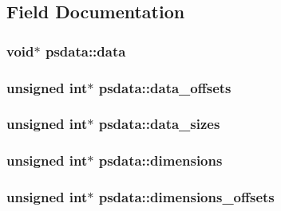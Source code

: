 \subsection{Field Documentation}
\hypertarget{structpsdata_aec5fdd50200a11795db62f21f2fedbe7}{}
\subsubsection[{data}]{\setlength{\rightskip}{0pt plus 5cm}void$\ast$ psdata\+::data}\label{structpsdata_aec5fdd50200a11795db62f21f2fedbe7}
\hypertarget{structpsdata_a372c86d30fafae1b30546d20f02cf982}{}
\subsubsection[{data\+\_\+offsets}]{\setlength{\rightskip}{0pt plus 5cm}unsigned int$\ast$ psdata\+::data\+\_\+offsets}\label{structpsdata_a372c86d30fafae1b30546d20f02cf982}
\hypertarget{structpsdata_a80714eccad0f11f36babbbaf7360364b}{}
\subsubsection[{data\+\_\+sizes}]{\setlength{\rightskip}{0pt plus 5cm}unsigned int$\ast$ psdata\+::data\+\_\+sizes}\label{structpsdata_a80714eccad0f11f36babbbaf7360364b}
\hypertarget{structpsdata_a9e5bdb18e75953accfd17efe2c1154ad}{}
\subsubsection[{dimensions}]{\setlength{\rightskip}{0pt plus 5cm}unsigned int$\ast$ psdata\+::dimensions}\label{structpsdata_a9e5bdb18e75953accfd17efe2c1154ad}
\hypertarget{structpsdata_a889d0e2c4ab295832a0480cc6d149619}{}
\subsubsection[{dimensions\+\_\+offsets}]{\setlength{\rightskip}{0pt plus 5cm}unsigned int$\ast$ psdata\+::dimensions\+\_\+offsets}\label{structpsdata_a889d0e2c4ab295832a0480cc6d149619}
\hypertarget{structpsdata_ac507921034797a74a9f5789e70166179}{}
